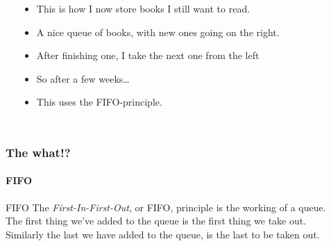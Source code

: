 \begin{frame}
\begin{columns}
\begin{center}
			\end{center}
		\begin{itemize}
			\item This is how I now store books I still want to read.
				\pause
			\item A nice \alert{queue} of books, with new ones going on the right.
				\pause
			\item After finishing one, I take the next one from the left
				\pause
			\item So after a few weeks\dots
				\pause
			\item This uses the \alert{FIFO}-principle.
		\end{itemize}
	\end{columns}
\end{frame}

\begin{frame}
	\frametitle{The what!?}
	\framesubtitle{FIFO}
	
		\begin{block}{FIFO}
			The \textit{First-In-First-Out}, or FIFO, principle is the working of a queue.\\
			\pause
			The first thing we've added to the queue is the first thing we take out.\\
			\pause
			Similarly the last we have added to the queue, is the last to be taken out.
		\end{block}	
\end{frame}

